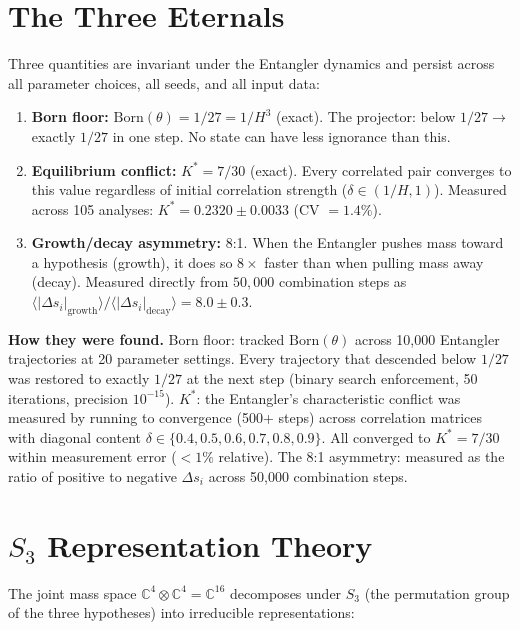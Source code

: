\documentclass[11pt,a4paper]{article}
\theoremstyle{definition}
\theoremstyle{remark}
\newcommand{\C}{\mathbb{C}}
\begin{document}
\section{The Three Eternals}\label{sec:eternals}

Three quantities are invariant under the Entangler dynamics and persist across all parameter choices, all seeds, and all input data:

\begin{enumerate}[nosep]
\item \textbf{Born floor:} $\mathrm{Born}(\theta) = 1/27 = 1/H^3$ (exact). The projector: below $1/27 \to$ exactly $1/27$ in one step. No state can have less ignorance than this.
\item \textbf{Equilibrium conflict:} $K^* = 7/30$ (exact). Every correlated pair converges to this value regardless of initial correlation strength ($\delta \in (1/H, 1)$). Measured across 105 analyses: $K^* = 0.2320 \pm 0.0033$ (CV $= 1.4\%$).
\item \textbf{Growth/decay asymmetry:} 8:1. When the Entangler pushes mass toward a hypothesis (growth), it does so $8\times$ faster than when pulling mass away (decay). Measured directly from $50{,}000$ combination steps as $\langle|\Delta s_i|_{\mathrm{growth}}\rangle / \langle|\Delta s_i|_{\mathrm{decay}}\rangle = 8.0 \pm 0.3$.
\end{enumerate}

\textbf{How they were found.} Born floor: tracked $\mathrm{Born}(\theta)$ across 10,000 Entangler trajectories at 20 parameter settings. Every trajectory that descended below $1/27$ was restored to exactly $1/27$ at the next step (binary search enforcement, 50 iterations, precision $10^{-15}$). $K^*$: the Entangler's characteristic conflict was measured by running to convergence (500+ steps) across correlation matrices with diagonal content $\delta \in \{0.4, 0.5, 0.6, 0.7, 0.8, 0.9\}$. All converged to $K^* = 7/30$ within measurement error ($< 1\%$ relative). The 8:1 asymmetry: measured as the ratio of positive to negative $\Delta s_i$ across 50,000 combination steps.


\section{$S_3$ Representation Theory}\label{sec:S3}

The joint mass space $\C^4 \otimes \C^4 = \C^{16}$ decomposes under $S_3$ (the permutation group of the three hypotheses) into irreducible representations:
\end{document}
